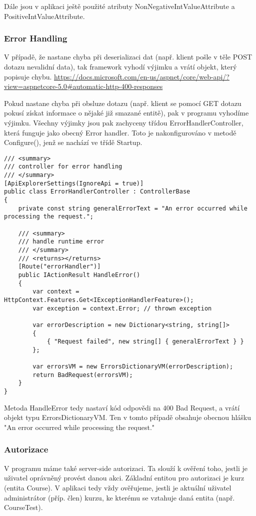 Dále jsou v aplikaci ještě použité atributy NonNegativeIntValueAttribute a PositiveIntValueAttribute.


\subsubsection*{Error Handling}

V případě, že nastane chyba při deserializaci dat (např. klient pošle v těle POST dotazu nevalidní data), tak framework vyhodí výjimku a vrátí objekt, který popisuje chybu. \url{https://docs.microsoft.com/en-us/aspnet/core/web-api/?view=aspnetcore-5.0#automatic-http-400-responses}

Pokud nastane chyba při obsluze dotazu (např. klient se pomocí GET dotazu pokusí získat informace o nějaké již smazané entitě), pak v programu vyhodíme výjimku. Všechny výjimky jsou pak zachyceny třídou ErrorHandlerController, která funguje jako obecný Error handler.
Toto je nakonfigurováno v metodě Configure(), jenž se nachází ve třídě Startup.
\begin{lstlisting}
/// <summary>
/// controller for error handling
/// </summary>
[ApiExplorerSettings(IgnoreApi = true)]
public class ErrorHandlerController : ControllerBase
{
	private const string generalErrorText = "An error occurred while processing the request.";
	
	/// <summary>
	/// handle runtime error
	/// </summary>
	/// <returns></returns>
	[Route("errorHandler")]
	public IActionResult HandleError()
	{
		var context = HttpContext.Features.Get<IExceptionHandlerFeature>();
		var exception = context.Error; // thrown exception
		
		var errorDescription = new Dictionary<string, string[]>
		{
			{ "Request failed", new string[] { generalErrorText } }
		};
		
		var errorsVM = new ErrorsDictionaryVM(errorDescription);
		return BadRequest(errorsVM);
	}
}
\end{lstlisting}
Metoda HandleError tedy nastaví kód odpovědi na 400 Bad Request, a vrátí objekt typu ErrorsDictionaryVM.
Ten v tomto případě obsahuje obecnou hlášku "An error occurred while processing the request."

\subsubsection*{Autorizace}

V programu máme také server-side autorizaci. Ta slouží k ověření toho, jestli je uživatel oprávněný provést danou akci. Základní entitou pro autorizaci je kurz (entita Course). V aplikaci tedy vždy ověřujeme, jestli je aktuální uživatel administrátor (příp. člen) kurzu, ke kterému se vztahuje daná entita (např. CourseTest).

